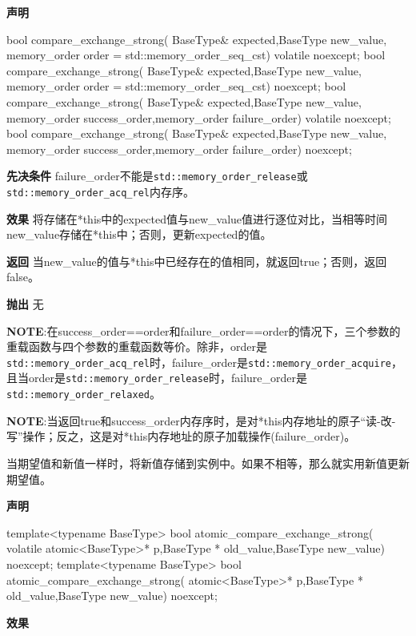 \textbf{声明}

\begin{cpp}
bool compare_exchange_strong(
    BaseType& expected,BaseType new_value,
    memory_order order = std::memory_order_seq_cst) volatile noexcept;
bool compare_exchange_strong(
    BaseType& expected,BaseType new_value,
    memory_order order = std::memory_order_seq_cst) noexcept;
bool compare_exchange_strong(
    BaseType& expected,BaseType new_value,
    memory_order success_order,memory_order failure_order)
    volatile noexcept;
bool compare_exchange_strong(
    BaseType& expected,BaseType new_value,
    memory_order success_order,memory_order failure_order) noexcept;
\end{cpp}

\textbf{先决条件}
failure\_order不能是\texttt{std::memory\_order\_release}或\texttt{std::memory\_order\_acq\_rel}内存序。

\textbf{效果}
将存储在*this中的expected值与new\_value值进行逐位对比，当相等时间new\_value存储在*this中；否则，更新expected的值。

\textbf{返回}
当new\_value的值与*this中已经存在的值相同，就返回true；否则，返回false。

\textbf{抛出}
无

\textbf{NOTE}:在success\_order==order和failure\_order==order的情况下，三个参数的重载函数与四个参数的重载函数等价。除非，order是\texttt{std::memory\_order\_acq\_rel}时，failure\_order是\texttt{std::memory\_order\_acquire}，且当order是\texttt{std::memory\_order\_release}时，failure\_order是\texttt{std::memory\_order\_relaxed}。

\textbf{NOTE}:当返回true和success\_order内存序时，是对*this内存地址的原子“读-改-写”操作；反之，这是对*this内存地址的原子加载操作(failure\_order)。


当期望值和新值一样时，将新值存储到实例中。如果不相等，那么就实用新值更新期望值。

\textbf{声明}

\begin{cpp}
template<typename BaseType>
bool atomic_compare_exchange_strong(
    volatile atomic<BaseType>* p,BaseType * old_value,BaseType new_value)
    noexcept;
template<typename BaseType>
bool atomic_compare_exchange_strong(
    atomic<BaseType>* p,BaseType * old_value,BaseType new_value) noexcept;
\end{cpp}

\textbf{效果}

